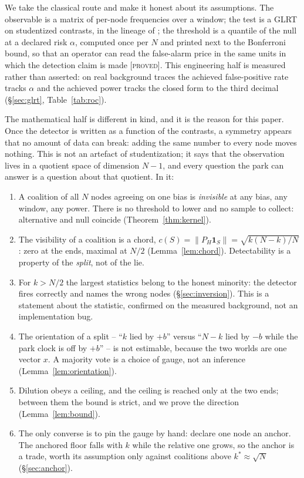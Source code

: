 \documentclass[10pt,twocolumn,a4paper]{article}
\newcommand{\proved}{\textcolor{teal!70!black}{\textsc{[proved]}}}
\theoremstyle{definition}
\theoremstyle{remark}
\newcommand{\PH}{P_{H}}
\newcommand{\one}{\mathbf{1}}
\begin{document}
We take the classical route and make it honest about its assumptions. The
observable is a matrix of per-node frequencies over a window; the test is a GLRT
on studentized contrasts, in the lineage of \cite{lehmann2005}; the threshold is
a quantile of the null at a declared risk $\alpha$, computed once per $N$ and
printed next to the Bonferroni bound, so that an operator can read the
false-alarm price in the same units in which the detection claim is made
\proved. This engineering half is measured rather than asserted: on real
background traces the achieved false-positive rate tracks $\alpha$ and the
achieved power tracks the closed form to the third decimal
(\S\ref{sec:glrt}, Table~\ref{tab:roc}).

The mathematical half is different in kind, and it is the reason for this paper.
Once the detector is written as a function of the contrasts, a symmetry appears
that no amount of data can break: adding the same number to every node moves
nothing. This is not an artefact of studentization; it says that the observation
lives in a quotient space of dimension $N-1$, and every question the park can
answer is a question about that quotient. In it:

\begin{enumerate}
\item A coalition of all $N$ nodes agreeing on one bias is \emph{invisible} at
      any bias, any window, any power. There is no threshold to lower and no
      sample to collect: alternative and null coincide
      (Theorem~\ref{thm:kernel}).
\item The visibility of a coalition is a chord,
      $c(S)=\|\PH\one_S\|=\sqrt{k(N-k)/N}$: zero at the ends, maximal at $N/2$
      (Lemma~\ref{lem:chord}). Detectability is a property of the \emph{split},
      not of the lie.
\item For $k>N/2$ the largest statistics belong to the honest minority: the
      detector fires correctly and names the wrong nodes
      (\S\ref{sec:inversion}). This is a statement about the statistic,
      confirmed on the measured background, not an implementation bug.
\item The orientation of a split -- ``$k$ lied by $+b$'' versus ``$N-k$ lied by
      $-b$ while the park clock is off by $+b$'' -- is not estimable, because the
      two worlds are one vector $x$. A majority vote is a choice of gauge, not an
      inference (Lemma~\ref{lem:orientation}).
\item Dilution obeys a ceiling, and the ceiling is reached only at the two ends;
      between them the bound is strict, and we prove the direction
      (Lemma~\ref{lem:bound}).
\item The only converse is to pin the gauge by hand: declare one node an anchor.
      The anchored floor falls with $k$ while the relative one grows, so the
      anchor is a trade, worth its assumption only against coalitions above
      $k^\ast\approx\sqrt{N}$ (\S\ref{sec:anchor}).
\end{enumerate}
\end{document}

